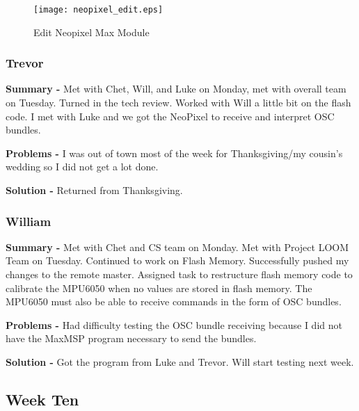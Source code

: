 \documentclass[onecolumn, draftclsnofoot,10pt, compsoc]{IEEEtran}
\begin{document}
    \begin{figure}[H]
        \centering
        \caption{Edit Neopixel Max Module}
        \label{fig:neopixel_edit}
        \texttt{[image: neopixel\_edit.eps]}
    \end{figure}


\subsubsection*{Trevor}
    \begin{adjustwidth}{2.5em}{0pt}
    \textbf{Summary -} Met with Chet, Will, and Luke on Monday, met with overall team on Tuesday. Turned in the tech review. Worked with Will a little bit on the flash code. I met with Luke and we got the NeoPixel to receive and interpret OSC bundles.
    
    \textbf{Problems -} I was out of town most of the week for Thanksgiving/my cousin's wedding so I did not get a lot done.
    \end{adjustwidth}
    \begin{adjustwidth}{5em}{0pt}
    \textbf{Solution -} Returned from Thanksgiving.
    \end{adjustwidth}
\subsubsection*{William}
    \begin{adjustwidth}{2.5em}{0pt}
    \textbf{Summary -} Met with Chet and CS team on Monday. Met with Project LOOM Team on Tuesday. Continued to work on Flash Memory. Successfully pushed my changes to the remote master. Assigned task to restructure flash memory code to calibrate the MPU6050 when no values are stored in flash memory. The MPU6050 must also be able to receive commands in the form of OSC bundles.
    
    \textbf{Problems -} Had difficulty testing the OSC bundle receiving because I did not have the MaxMSP program necessary to send the bundles.
    \end{adjustwidth}
    \begin{adjustwidth}{5em}{0pt}
    \textbf{Solution -} Got the program from Luke and Trevor. Will start testing next week.
    \end{adjustwidth}



\subsection{Week Ten}
\end{document}
